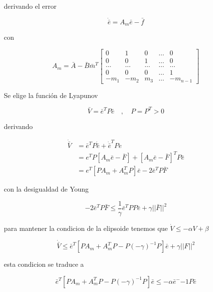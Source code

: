 derivando el error

\begin{equation*}
    \dot{\bar{e}}=A_m\bar{e}-\bar{f}
\end{equation*}

con

\begin{equation*}
    A_m=\bar{A}-\bar{B}\bar{m}^T\begin{bmatrix}
        0 & 1 & 0 & \dots & 0 \\
        0 & 0 & 1 & \dots & 0 \\
        \dots & \dots & \dots & \dots &\dots \\
        0 & 0 & 0 & \dots & 1 \\
        -m_1 & -m_2 & m_3 & \dots & -m_{n-1}
    \end{bmatrix}
\end{equation*}

Se elige la función de Lyapunov

\begin{equation*}
    \bar{V}=\bar{e}^T P \bar{e} \quad , \quad P=P^T>0
\end{equation*}

derivando

\begin{equation*}
    \begin{aligned}
        \dot{\bar{V}}&=\bar{e}^TP\dot{\bar{e}}+\dot{\bar{e}}^TPe\\
         &=e^TP[A_m\bar{e}-\bar{F}]+[A_m\bar{e}-\bar{F}]^TP\bar{e}\\
         &=e^T[PA_m+A_m^TP]\bar{e}-2\bar{e}^TP\bar{F}
    \end{aligned}
\end{equation*}

con la desigualdad de Young

\begin{equation*}
    -2\bar{e}^TP\bar{F} \leq \frac{1}{\gamma}\bar{e}^TPP\bar{e}+\gamma||\bar{F}||^2
\end{equation*}

para mantener la condicion de la elipsoide tenemos que $\dot{V}\leq -\alpha V+\beta$

\begin{equation*}
    \dot{\bar{V}}\leq \bar{e}^T[PA_m+A_m^TP-P(-\gamma)^{-1}P]\bar{e}+\gamma||F||^2
\end{equation*}

esta condicion se traduce a

\begin{equation*}
    \bar{e}^T[PA_m+A_m^TP-P(-\gamma)^{-1}P]\bar{e} \leq - \alpha\bar{e}^-{-1}P\bar{e}
\end{equation*}

